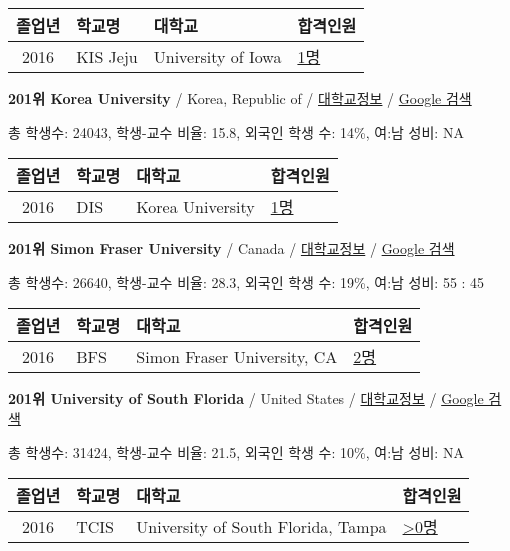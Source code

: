 \documentclass[13pt,]{article}
\begin{document}
\begin{longtable}[]{@{}clll@{}}
\toprule
졸업년 & 학교명 & 대학교 & 합격인원\tabularnewline
\midrule
\endhead
2016 & KIS Jeju & University of Iowa &
\href{http://cafe.naver.com/assarabia/11596}{1명}\tabularnewline
\bottomrule
\end{longtable}

\textbf{201위 Korea University} / Korea, Republic of /
\href{https://www.timeshighereducation.com/world-university-rankings/korea-university?ranking-dataset=589595}{대학교정보}
/ \href{http://www.google.com/search?q=Korea+University}{Google 검색}

총 학생수: 24043, 학생-교수 비율: 15.8, 외국인 학생 수: 14\%, 여:남
성비: NA

\begin{longtable}[]{@{}clll@{}}
\toprule
졸업년 & 학교명 & 대학교 & 합격인원\tabularnewline
\midrule
\endhead
2016 & DIS & Korea University &
\href{http://cafe.naver.com/assarabia/11591}{1명}\tabularnewline
\bottomrule
\end{longtable}

\textbf{201위 Simon Fraser University} / Canada /
\href{https://www.timeshighereducation.com/world-university-rankings/simon-fraser-university?ranking-dataset=589595}{대학교정보}
/ \href{http://www.google.com/search?q=Simon+Fraser+University}{Google
검색}

총 학생수: 26640, 학생-교수 비율: 28.3, 외국인 학생 수: 19\%, 여:남
성비: 55 : 45

\begin{longtable}[]{@{}clll@{}}
\toprule
졸업년 & 학교명 & 대학교 & 합격인원\tabularnewline
\midrule
\endhead
2016 & BFS & Simon Fraser University, CA &
\href{http://cafe.naver.com/assarabia/11597}{2명}\tabularnewline
\bottomrule
\end{longtable}

\textbf{201위 University of South Florida} / United States /
\href{https://www.timeshighereducation.com/world-university-rankings/university-of-south-florida?ranking-dataset=589595}{대학교정보}
/
\href{http://www.google.com/search?q=University+of+South+Florida}{Google
검색}

총 학생수: 31424, 학생-교수 비율: 21.5, 외국인 학생 수: 10\%, 여:남
성비: NA

\begin{longtable}[]{@{}clll@{}}
\toprule
졸업년 & 학교명 & 대학교 & 합격인원\tabularnewline
\midrule
\endhead
2016 & TCIS & University of South Florida, Tampa &
\href{http://cafe.naver.com/assarabia/11598}{\textgreater{}0명}\tabularnewline
\bottomrule
\end{longtable}
\end{document}
